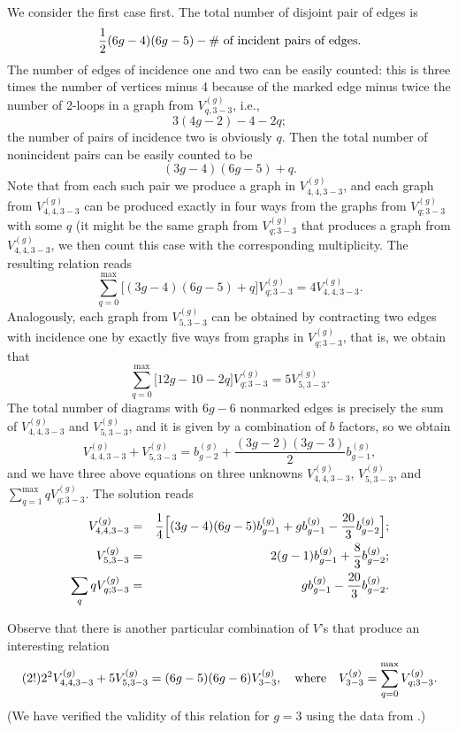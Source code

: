 \documentclass[11pt]{article}
\def\bea{\begin{eqnarray}}
\def\eea{\end{eqnarray}}
\def\bea{\begin{eqnarray}}
\def\eea{\end{eqnarray}}
\def\beq{\begin{equation}}
\def\eeq{\end{equation}}
\theoremstyle{plain}
\theoremstyle{definition}
\def\beq{\begin{equation}}
\def\eeq{\end{equation}}
\def\bea{\begin{eqnarray}}
\def\eea{\end{eqnarray}}
\begin{document}
We consider the first case first. The total number of disjoint pair of edges is
\beq
\frac12(6g-4)(6g-5)-\hbox{\# of incident pairs of edges}.
\eeq
The number of edges of incidence one and two can be easily counted: this is three times 
the number of vertices minus 4
because of the marked edge minus twice the number of 2-loops in a graph from $V^{(g)}_{q,3{-}3}$, i.e.,
$$
3(4g-2)-4-2q;
$$
the number of pairs of incidence two is obviously $q$. Then the total number of nonincident pairs can be easily counted to be
$$
(3g-4)(6g-5)+q.
$$
Note that from each such pair we produce a graph in
$V^{(g)}_{4,4,3{-}3}$, and each graph from $V^{(g)}_{4,4,3{-}3}$ can
be produced exactly in four ways from the graphs from
$V^{(g)}_{q;3{-}3}$ with some $q$ (it might be the same graph from
$V^{(g)}_{q;3{-}3}$ that produces a graph from
$V^{(g)}_{4,4,3{-}3}$, we then count this case with the
corresponding multiplicity. The resulting relation reads
\beq
\label{3-3->44}
\sum_{q=0}^{\mathrm{max}}\bigl[(3g-4)(6g-5)+q\bigr]V^{(g)}_{q;3{-}3}=4 V^{(g)}_{4,4,3{-}3}.
\eeq
Analogously, each graph from $V^{(g)}_{5,3{-}3}$ can be obtained by
contracting two edges with incidence one by exactly five ways from
graphs in $V^{(g)}_{q;3{-}3}$, that is, we obtain that
\beq
\label{3-3->5}
\sum_{q=0}^{\mathrm{max}}\bigl[12g-10-2q\bigr]V^{(g)}_{q;3{-}3}=5 V^{(g)}_{5,3{-}3}.
\eeq
The total number of diagrams with $6g-6$ nonmarked edges is
precisely the sum of $V^{(g)}_{4,4,3{-}3}$ and $V^{(g)}_{5,3{-}3}$,
and it is given by a combination of $b$ factors, so we obtain
\beq
\label{6g-6}
V^{(g)}_{4,4,3{-}3}+V^{(g)}_{5,3{-}3}=b^{(g)}_{g-2}+\frac{(3g-2)(3g-3)}{2}b^{(g)}_{g-1},
\eeq
and we have three above equations on three unknowns $V^{(g)}_{4,4,3{-}3}$, $V^{(g)}_{5,3{-}3}$, and
$\sum_{q=1}^{\mathrm{max}}qV^{(g)}_{q;3{-}3}$. The solution reads
\bea
V^{(g)}_{4,4,3{-}3}&=&\frac14\Bigl[(3g-4)(6g-5)b^{(g)}_{g-1}+g b^{(g)}_{g-1}-\frac{20}{3}b^{(g)}_{g-2} \Bigr];
\label{V44}\\
V^{(g)}_{5,3{-}3}&=&2(g-1)b^{(g)}_{g-1}+\frac{8}{3}b^{(g)}_{g-2};
\label{V5}\\
\sum_{q}q V^{(g)}_{q;3{-}3}&=&gb^{(g)}_{g-1}-\frac{20}{3}b^{(g)}_{g-2}.
\label{qVq}
\eea

Observe that there is another particular combination of $V$'s that produce an interesting relation
\beq
\label{mystery}
(2!)2^2 V^{(g)}_{4,4,3{-}3}+5 V^{(g)}_{5,3{-}3}=(6g-5)(6g-6)V^{(g)}_{3{-}3},\quad\hbox{where}\quad
V^{(g)}_{3{-}3}=\sum_{q=0}^{\mathrm{max}}V^{(g)}_{q;3{-}3}.
\eeq
(We have verified the validity of this relation for $g=3$ using the data from \cite{Mil-Pen}.)
\end{document}
